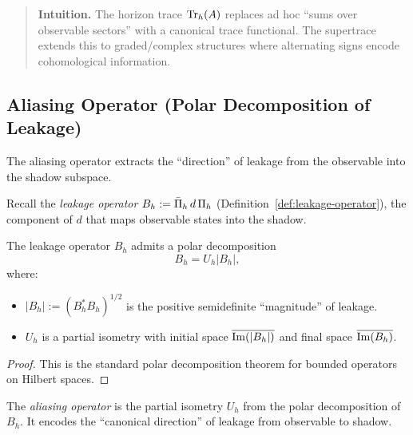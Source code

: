 \begin{quote}\small
\textbf{Intuition.}
The horizon trace $\CCHTrace{h}{A}$ replaces ad hoc ``sums over observable sectors'' with a canonical trace functional.
The supertrace extends this to graded/complex structures where alternating signs encode cohomological information.
\end{quote}

\subsection{Aliasing Operator (Polar Decomposition of Leakage)}
\label{subsec:aliasing}

The aliasing operator extracts the ``direction'' of leakage from the observable into the shadow subspace.

Recall the \emph{leakage operator} $\CCLeak{d}{h} := \CCLeakExpr{d}{h}$ (Definition~\ref{def:leakage-operator}), the component of $d$ that maps observable states into the shadow.

\begin{theorem}
\label{thm:aliasing-polar}
The leakage operator $B_h$ admits a polar decomposition
\[
B_h = U_h |B_h|,
\]
where:
\begin{itemize}[itemsep=0.2em]
\item $|B_h| := (B_h^* B_h)^{1/2}$ is the positive semidefinite ``magnitude'' of leakage.
\item $U_h$ is a partial isometry with initial space $\overline{\Img(|B_h|)}$ and final space $\overline{\Img(B_h)}$.
\end{itemize}
\end{theorem}

\begin{proof}
This is the standard polar decomposition theorem for bounded operators on Hilbert spaces.
\end{proof}

\begin{definition}
\label{def:aliasing-operator}
The \emph{aliasing operator} is the partial isometry $U_h$ from the polar decomposition of $B_h$.
It encodes the ``canonical direction'' of leakage from observable to shadow.
\end{definition}

